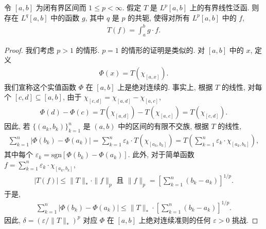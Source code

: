 \documentclass[../../main.tex]{subfiles}
\begin{document}
\begin{theorem}\label{theorem:ch08-Riesz区间}
令 $[a,b]$ 为闭有界区间而 $1\leqslant p<\infty$. 假定 $T$ 是 $L^{p}[a,b]$ 上的有界线性泛函. 则存在 $L^{q}[a,b]$ 中的函数 $g$, 其中 $q$ 是 $p$ 的共轭, 使得对所有 $L^{p}[a,b]$ 中的 $f$,
\begin{align*}
T(f)=\int_{a}^{b}g\cdot f.
\end{align*}
\end{theorem}

\begin{proof}
我们考虑 $p>1$ 的情形. $p=1$ 的情形的证明是类似的. 对 $[a,b]$ 中的 $x$, 定义
\begin{align*}
\Phi(x)=T(\chi_{[a,x]}).
\end{align*}
我们宣称这个实值函数 $\Phi$ 在 $[a,b]$ 上是绝对连续的. 事实上, 根据 $T$ 的线性, 对每个 $[c,d]\subseteq[a,b]$, 由于 $\chi_{[c,d]}=\chi_{[a,d]}-\chi_{[a,c]}$,
\begin{align*}
\Phi(d)-\Phi(c)=T(\chi_{[a,d]})-T(\chi_{[a,c]})=T(\chi_{[c,d]}).
\end{align*}
因此, 若 $\{(a_{k},b_{k})\}_{k=1}^{n}$ 是 $(a,b)$ 中的区间的有限不交族, 根据 $T$ 的线性,
\begin{align}
\sum_{k=1}^{n}|\Phi(b_{k})-\Phi(a_{k})|=\sum_{k=1}^{n}\varepsilon_{k}\cdot T(\chi_{[a_{k},b_{k}]})=T\left(\sum_{k=1}^{n}\varepsilon_{k}\cdot\chi_{[a_{k},b_{k}]}\right),\label{align:ch08-绝对连续估计}
\end{align}
其中每个 $\varepsilon_{k}=\mathrm{sgn}[\Phi(b_{k})-\Phi(a_{k})]$. 此外, 对于简单函数 $f=\sum_{k=1}^{n}\varepsilon_{k}\cdot\chi_{[a_{k},b_{k}]}$,
\begin{align*}
|T(f)|\leqslant\|T\|_{*}\cdot\|f\|_{p}\text{ 且 }\|f\|_{p}=\left[\sum_{k=1}^{n}(b_{k}-a_{k})\right]^{1/p}.
\end{align*}
于是,
\begin{align*}
\sum_{k=1}^{n}|\Phi(b_{k})-\Phi(a_{k})|\leqslant\|T\|_{*}\cdot\left[\sum_{k=1}^{n}(b_{k}-a_{k})\right]^{1/p}.
\end{align*}
因此, $\delta=(\varepsilon/\|T\|_{*})^{p}$ 对应 $\Phi$ 在 $[a,b]$ 上绝对连续准则的任何 $\varepsilon>0$ 挑战.


\end{proof}
\end{document}
